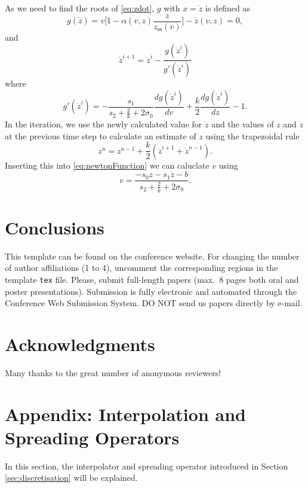 \documentclass[twoside,a4paper]{article}
\begin{document}
As we need to find the roots of \eqref{eq:zdot}, $g$ with $x=\dot z$ is defined as
\begin{equation}
   g(\dot z) = v\bigg[1-\alpha(v, z)\frac{z}{z_\text{ss}(v)}\bigg] -  \dot z(v,z) = 0,
\end{equation}
and
\begin{equation}
    \dot z^{i+1} = \dot z^i - \frac{g(\dot z^i)}{g'(\dot z^i)}
\end{equation}
where
\begin{equation}
    g'(\dot z^i) = -\frac{s_1}{s_2+\frac{2}{k} + 2\sigma_0}\frac{dg(\dot z^i)}{dv} + \frac{k}{2}\frac{dg(\dot z^i)}{dz} - 1.
\end{equation}
In the iteration, we use the newly calculated value for $\dot z$ and the values of $z$ and $\dot z$ at the previous time step to calculate an estimate of $z$ using the trapezoidal rule
\begin{equation}
    z^n = z^{n-1} + \frac{k}{2}(\dot z^{i+1} + \dot z^{n-1}).
\end{equation}
Inserting this into \eqref{eq:newtonFunction} we can caluclate $v$ using
\begin{equation}
    v = \frac{-s_0z-s_1\dot z-b}{s_2 + \frac{2}{k} + 2\sigma_0}.
\end{equation}

\section{Conclusions}
This template can be found on the conference website.
For changing the number of author affiliations (1 to 4), uncomment the corresponding regions in the template \texttt{tex} file.
Please, submit full-length papers (max.~8 pages both oral and poster presentations).
Submission is fully electronic and automated through the Conference Web Submission System.
DO NOT send us papers directly by e-mail.

\section{Acknowledgments}
Many thanks to the great number of anonymous reviewers!

\nocite{*}


\section{Appendix: Interpolation and Spreading Operators}
\label{app:interpol}
In this section, the interpolator and spreading operator introduced in Section \ref{sec:discretisation} will be explained.
\end{document}
